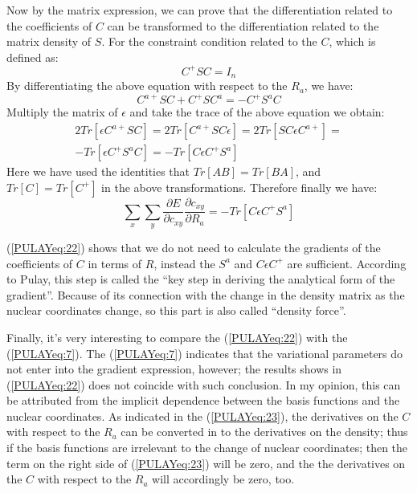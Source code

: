 Now by the matrix expression, we can prove that the differentiation
related to the coefficients of $C$ can be transformed to the
differentiation related to the matrix density of $S$. For the
constraint condition related to the $C$, which is defined as:
\begin{equation}\label{}
  C^{+}SC = I_{n}
\end{equation}
By differentiating the above equation with respect to the $R_{a}$, we
have:
\begin{equation}\label{PULAYeq:23}
  C^{a+}SC + C^{+}SC^{a} = -C^{+}S^{a}C
\end{equation}
Multiply the matrix of $\epsilon$ and take the trace of the above
equation we obtain:
\begin{multline}\label{}
  2Tr[\epsilon C^{a+}SC] = 2Tr[C^{a+}SC\epsilon] = 2Tr[SC\epsilon
  C^{a+}] =\\
  -Tr[\epsilon C^{+}S^{a}C] = -Tr[C\epsilon C^{+}S^{a}]
\end{multline}
Here we have used the identities that $Tr[AB] = Tr[BA]$, and $Tr[C] =
Tr[C^{+}]$ in the above transformations. Therefore finally we have:
\begin{equation}\label{PULAYeq:22}
  \sum_{x}\sum_{y}\frac{\partial E}{\partial c_{xy}}\frac{\partial
    c_{xy}}{\partial R_{a}} = -Tr[C\epsilon C^{+}S^{a}]
\end{equation}

(\ref{PULAYeq:22}) shows that we do not need to calculate the
gradients of the coefficients of $C$ in terms of $R$, instead the
$S^{a}$ and $C\epsilon C^{+}$ are sufficient. According to
Pulay\cite{Pulay5}, this step is called the ``key step in deriving the
analytical form of the gradient''. Because of its connection with the
change in the density matrix as the nuclear coordinates change, so
this part is also called ``density force''.

Finally, it's very interesting to compare the (\ref{PULAYeq:22}) with
the (\ref{PULAYeq:7}). The (\ref{PULAYeq:7}) indicates that the
variational parameters do not enter into the gradient expression,
however; the results shows in (\ref{PULAYeq:22}) does not coincide
with such conclusion. In my opinion, this can be attributed from the
implicit dependence between the basis functions and the nuclear
coordinates. As indicated in the (\ref{PULAYeq:23}), the derivatives
on the $C$ with respect to the $R_{a}$ can be converted in to the
derivatives on the density; thus if the basis functions are irrelevant
to the change of nuclear coordinates; then the term on the right side
of (\ref{PULAYeq:23}) will be zero, and the the derivatives on the $C$
with respect to the $R_{a}$ will accordingly be zero, too.

